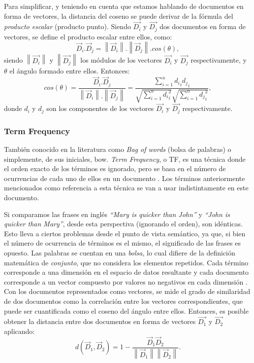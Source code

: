 \bigskip Para simplificar, y teniendo en cuenta que estamos hablando de documentos en forma de vectores, la distancia del coseno se puede derivar de la fórmula del \textit{producto escalar} (producto punto). Siendo \(\overrightarrow{D_i}\) y \(\overrightarrow{D_j}\) dos documentos en forma de vectores, se define el producto escalar entre ellos, como:
\[\vec{D}_i.\vec{D}_j = \left \| \vec{D}_i \right \|.\left \| \vec{D}_j \right \|.cos(\theta),\]
siendo \(\left \|\overrightarrow{D_i}\right \|\) y \(\left \|\overrightarrow{D_j}\right \|\) los módulos de los vectores \(\overrightarrow{D_i}\) y \(\overrightarrow{D_j}\) respectivamente, y $\theta$ el ángulo formado entre ellos. Entonces:
\[cos(\theta) = \frac{\vec{D}_i.\vec{D}_j}{\left \| \vec{D}_i \right \|.\left \| \vec{D}_j \right \|}=\frac{\sum_{i=1}^{n}{{d_i}_i{d_j}_i}}{\sqrt{\sum_{i=1}^{n}{{d_i}_i^{2}}}\sqrt{\sum_{i=1}^{n}{{d_j}_i^{2}}}},\]
donde \(d_i\) y \(d_j\) son los componentes de los vectores \(\overrightarrow{D_i}\) y \(\overrightarrow{D_j}\) respectivamente.

\subsubsection{Term Frequency}
También conocido en la literatura como \textit{Bag of words} (bolsa de palabras) o simplemente, de sus iniciales, bow. \textit{Term Frequency}, o TF, es una técnica donde el orden exacto de los términos es ignorado, pero se basa en el número de ocurrencias de cada uno de ellos en un documento \citep{christopher2008introduction}. Los términos anteriormente mencionados como referencia a esta técnica se van a usar indistintamente en este documento.

\bigskip Si comparamos las frases en inglés \textit{“Mary is quicker than John”} y \textit{“John is quicker than Mary”}, desde esta perspectiva (ignorando el orden), son idénticas. Esto lleva a ciertos problemas desde el punto de vista semántico, ya que, si bien el número de ocurrencia de términos es el mismo, el significado de las frases es opuesto. Las palabras se cuentan en una \textit{bolsa}, lo cual difiere de la definición matemática de \textit{conjunto}, que no considera los elementos repetidos. Cada término corresponde a una dimensión en el espacio de datos resultante y cada documento corresponde a un vector compuesto por valores no negativos en cada dimensión \citep{huang2008similarity}. Con los documentos representados como vectores, se mide el grado de similaridad de dos documentos como la correlación entre los vectores correspondientes, que puede ser cuantificada como el coseno del ángulo entre ellos. Entonces, es posible obtener la distancia entre dos documentos en forma de vectores \(\overrightarrow{D_1}\) y \(\overrightarrow{D_2}\) aplicando:
\[d(\vec{D}_1, \vec{D}_2) = 1 - \frac{\vec{D}_1 \vec{D}_2}{\left \| \vec{D}_1 \right\| \left \| \vec{D}_2 \right\|}.\]

